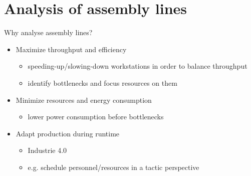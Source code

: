 
\section{Analysis of assembly lines}

  \begin{frame}{Why analyse assembly lines?}
    \begin{itemize}
      \setlength\itemsep{1em}
      \item Maximize throughput and efficiency
      \begin{itemize}
        \item speeding-up/slowing-down workstations in order to balance throughput
        \item identify bottlenecks and focus resources on them
      \end{itemize}
      \item Minimize resources and energy consumption
      \begin{itemize}
        \item lower power consumption before bottlenecks
      \end{itemize}
      \item Adapt production during runtime
      \begin{itemize}
        \item Industrie 4.0
        \item e.g. schedule personnel/resources in a tactic perspective
      \end{itemize}
    \end{itemize}
  \end{frame}
  
